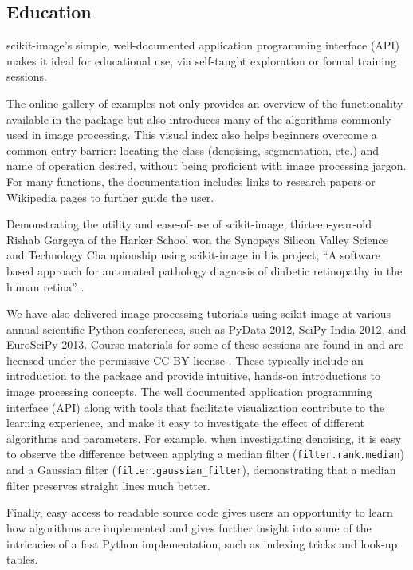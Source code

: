 
  \subsection*{Education}
    \label{education}

    scikit-image's simple, well-documented application programming interface (API) makes it ideal for educational use, via self-taught exploration or formal training sessions.

    The online gallery of examples not only provides an overview of the functionality available in the package but also introduces many of the algorithms commonly used in image processing. This visual index also helps beginners overcome a common entry barrier: locating the class (denoising, segmentation, etc.) and name of operation desired, without being proficient with image processing jargon.  For many functions, the documentation includes links to research papers or Wikipedia pages to further guide the user.

    Demonstrating the utility and ease-of-use of scikit-image, thirteen-year-old Rishab Gargeya of the Harker School won the Synopsys Silicon Valley Science and Technology Championship using scikit-image in his project, ``A software based approach for automated pathology diagnosis of diabetic retinopathy in the human retina'' \citep{sciencefair}.

    We have also delivered image processing tutorials using scikit-image at various annual scientific Python conferences, such as PyData 2012, SciPy India 2012, and EuroSciPy 2013. Course materials for some of these sessions are found in \cite{scipylecturenotes} and are licensed under the permissive CC-BY license \citep{cc-by}. These typically include an introduction to the package and provide intuitive, hands-on introductions to image processing concepts. The well documented application programming interface (API) along with tools that facilitate visualization contribute to the learning experience, and make it easy to investigate the effect of different algorithms and parameters. For example, when investigating denoising, it is easy to observe the difference between applying a median filter (\texttt{filter.rank.median}) and a Gaussian filter (\texttt{filter.gaussian\_filter}), demonstrating that a median filter preserves straight lines much better.

    Finally, easy access to readable source code gives users an opportunity to learn how algorithms are implemented and gives further insight into some of the intricacies of a fast Python implementation, such as indexing tricks and look-up tables.
